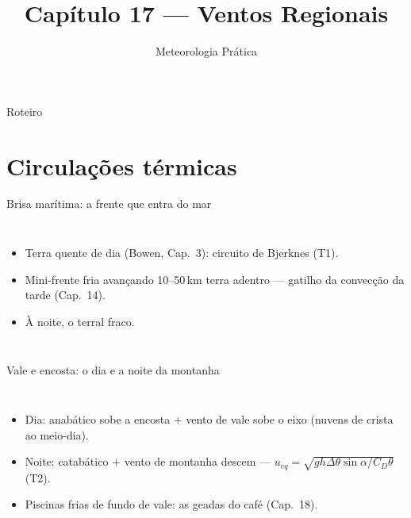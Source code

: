 \documentclass[aspectratio=169,11pt]{beamer}
\title[Cap. 17 --- Ventos Regionais]{Capítulo 17 --- Ventos Regionais}
\subtitle{Meteorologia Prática}
\author{}
\date{}
\begin{document}
\begin{frame}
  \titlepage
  \vfill
  \atribuicao
\end{frame}

\begin{frame}{Roteiro}
  \tableofcontents
\end{frame}

\section{Circulações térmicas}

\begin{frame}{Brisa marítima: a frente que entra do mar}
  \begin{columns}
    \begin{itemize}
      \item Terra quente de dia (Bowen, Cap.~3): circuito de
            Bjerknes (T1).
      \item Mini-frente fria avançando 10--50\,km terra adentro —
            gatilho da convecção da tarde (Cap.~14).
      \item À noite, o terral fraco.
    \end{itemize}
  \end{columns}
\end{frame}

\begin{frame}{Vale e encosta: o dia e a noite da montanha}
  \begin{columns}
    \begin{itemize}
      \item Dia: anabático sobe a encosta $+$ vento de vale sobe o
            eixo (nuvens de crista ao meio-dia).
      \item Noite: catabático $+$ vento de montanha descem —
            $u_{eq} = \sqrt{gh\Delta\theta\sin\alpha/C_D\theta}$
            (T2).
      \item Piscinas frias de fundo de vale: as geadas do café
            (Cap.~18).
    \end{itemize}
  \end{columns}
\end{frame}
\end{document}

